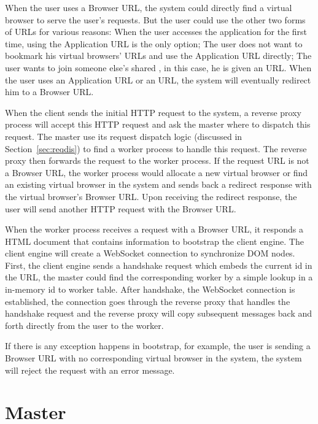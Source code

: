 When the user uses a Browser URL, the system could directly find
a virtual browser to serve the user's requests.
But the user could use the other two forms of URLs for various reasons:
When the user accesses the application for the first time,
using the Application URL is the only option;
The user does not want to bookmark his virtual browsers' URLs and
use the Application URL directly;
The user wants to join someone else's shared \appins{},
in this case, he is given an \appins{} URL.
When the user uses an Application URL or an \appins{} URL,
the system will eventually redirect him to a Browser URL.

When the client sends the initial HTTP request to the system,
a reverse proxy process will accept this HTTP request and
ask the master where to dispatch this request.
The master use its request dispatch logic (discussed in
Section~\ref{sec:reqdis}) to find a worker process to handle
this request.
The reverse proxy then forwards the request to the worker process.
If the request URL is not a Browser URL,
the worker process would allocate a new virtual browser
or find an existing virtual browser in
the system and sends back
a redirect response with the virtual browser's Browser URL.
Upon receiving the redirect response,
the user will send another HTTP request with the Browser URL.

When the worker process receives a request with a Browser URL,
it responds a HTML document that contains information
to bootstrap the client engine.
The client engine will create a WebSocket connection
to synchronize DOM nodes.
First, the client engine sends a handshake request
which embeds the current \appins id in the URL,
the master could find the corresponding worker
by a simple lookup in a in-memory \appins id to worker table.
After handshake, 
the WebSocket connection is established,
the connection goes through 
the reverse proxy that handles the handshake request
and the reverse proxy will copy subsequent messages
back and forth directly from the user to the worker.

If there is any exception happens in bootstrap,
for example, the user is sending a Browser URL with no corresponding
virtual browser in the system,
the system will reject the request with an error message.


\section{Master} 


